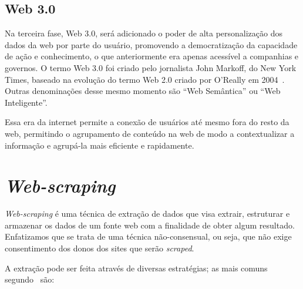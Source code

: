 \subsection{Web 3.0}

Na terceira fase, Web 3.0, será adicionado o poder de alta personalização dos dados da web por parte do usuário, promovendo a democratização da capacidade de ação e conhecimento, o que anteriormente era apenas acessível a companhias e governos.
O termo Web 3.0 foi criado pelo jornalista John Markoff, do New York Times, baseado na evolução do termo Web 2.0 criado por O’Really em 2004~\cite{Web32}. Outras denominações desse mesmo momento são ``Web Semântica'' ou ``Web Inteligente''.

Essa era da internet permite a conexão de usuários até mesmo fora do resto da web, permitindo o agrupamento de conteúdo na web de modo a contextualizar a informação e agrupá-la mais eficiente e rapidamente.

\section{\textit{Web-scraping}}

\textit{Web-scraping} é uma técnica de extração de dados que visa extrair, estruturar e armazenar os dados de um fonte web com a finalidade de obter algum resultado.
Enfatizamos que se trata de uma técnica não-consensual, ou seja, que não exige consentimento dos donos dos sites que serão \textit{scraped}.

A extração pode ser feita através de diversas estratégias; as mais comuns segundo~\cite{Scraping1} são: 

